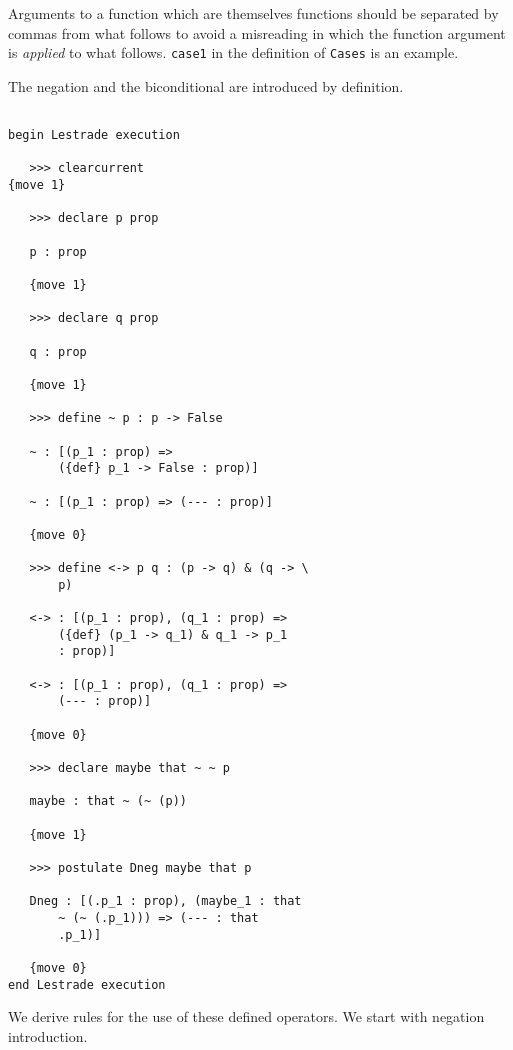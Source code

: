 \documentclass[12pt]{article}
\begin{document}
Arguments to a function which are themselves functions should be separated by commas from what follows to avoid
a misreading in which the function argument is {\em applied\/} to what follows.  {\tt case1} in the definition of
{\tt Cases} is an example.

The negation and the biconditional are introduced by definition.

\begin{verbatim}

begin Lestrade execution

   >>> clearcurrent
{move 1}

   >>> declare p prop

   p : prop

   {move 1}

   >>> declare q prop

   q : prop

   {move 1}

   >>> define ~ p : p -> False

   ~ : [(p_1 : prop) => 
       ({def} p_1 -> False : prop)]

   ~ : [(p_1 : prop) => (--- : prop)]

   {move 0}

   >>> define <-> p q : (p -> q) & (q -> \
       p)

   <-> : [(p_1 : prop), (q_1 : prop) => 
       ({def} (p_1 -> q_1) & q_1 -> p_1 
       : prop)]

   <-> : [(p_1 : prop), (q_1 : prop) => 
       (--- : prop)]

   {move 0}

   >>> declare maybe that ~ ~ p

   maybe : that ~ (~ (p))

   {move 1}

   >>> postulate Dneg maybe that p

   Dneg : [(.p_1 : prop), (maybe_1 : that 
       ~ (~ (.p_1))) => (--- : that 
       .p_1)]

   {move 0}
end Lestrade execution

\end{verbatim}

We derive rules for the use of these defined operators.  We start with negation introduction.
\end{document}
